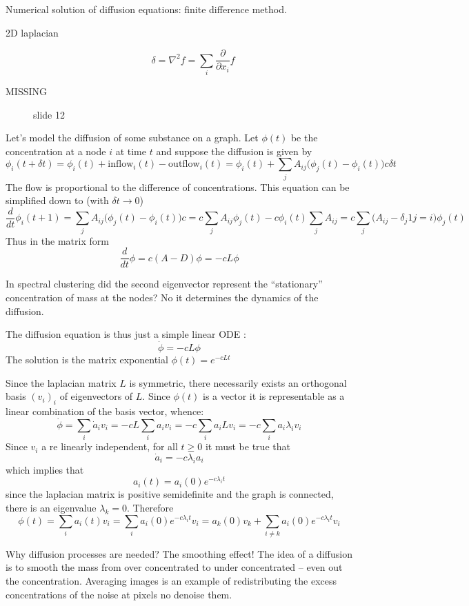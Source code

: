 \documentclass[a4paper]{article}
\begin{document}
Numerical solution of diffusion equations: finite difference method.

\begin{description}
	\item[2D laplacian] 
	\[\delta = \nabla^2 f = \sum_i \frac{\partial}{\partial x_i} f\]
	\item[MISSING] slide 12
\end{description}

Let's model the diffusion of some substance on a graph. Let $\phi(t)$ be the
concentration at a node $i$ at time $t$ and suppose the diffusion is given by
\[
\phi_i(t+\delta t)
= \phi_i(t) + \text{inflow}_i(t) - \text{outflow}_i(t)
= \phi_i(t) + \sum_j A_{ij} \bigl(\phi_j(t) - \phi_i(t)\bigr) c \delta t
\]
The flow is proportional to the difference of concentrations. This equation
can be simplified down to (with $\delta t \to 0$)
\[
\frac{d}{dt}\phi_i(t+1)
= \sum_j A_{ij} \bigl(\phi_j(t) - \phi_i(t)\bigr) c
= c \sum_j A_{ij} \phi_j(t) - c \phi_i(t) \sum_j A_{ij}
= c \sum_j \bigl( A_{ij} - \delta_j 1{j=i} \bigr) \phi_j(t)
\]
Thus in the matrix form
\[
\frac{d}{dt}\phi
= c (A-D) \phi
= - c L \phi
\]

In spectral clustering did the second eigenvector represent the ``stationary'' concentration of mass at the nodes? No it determines the dynamics of the diffusion.

The diffusion equation is thus just a simple linear ODE :
\[\dot{\phi} = -c L \phi\]
The solution is the matrix exponential $\phi(t) = e^{-c L t}$

Since the laplacian matrix $L$ is symmetric, there necessarily exists an
orthogonal basis $(v_i)_i$ of eigenvectors of $L$. Since $\phi(t)$ is a vector
it is representable as a linear combination of the basis vector, whence:
\[
\dot{\phi}
= \sum_i \dot{a}_i v_i
= - c L \sum_i a_i v_i
= - c \sum_i a_i L v_i
= - c \sum_i a_i \lambda_i v_i
\]
Since $v_i$ a re linearly independent, for all $t\geq0$ it must be true that
\[\dot{a}_i = - c \lambda_i a_i\]
which implies that
\[a_i(t) = a_i(0) e^{-c \lambda_i t}\]
since the laplacian matrix is positive semidefinite and the graph is connected,
there is an eigenvalue $\lambda_k=0$. Therefore
\[
\phi(t)
= \sum_i a_i(t) v_i
= \sum_i a_i(0) e^{-c \lambda_i t} v_i
= a_k(0) v_k + \sum_{i\neq k} a_i(0) e^{-c \lambda_i t} v_i
\]

Why diffusion processes are needed? The smoothing effect! The idea of a
diffusion is to smooth the mass from over concentrated to under concentrated --
even out the concentration. Averaging images is an example of redistributing
the excess concentrations of the noise at pixels no denoise them.
\end{document}
